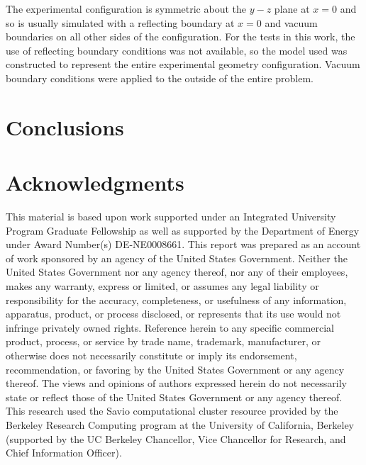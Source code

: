 \documentclass{article} %
\begin{document}
The experimental configuration is symmetric about the $y-z$ plane at $x = 0$
and so is usually simulated with a reflecting boundary at $x = 0$ and vacuum
boundaries on all other sides of the configuration. For the tests in this work,
the use of reflecting boundary conditions was not available, so the model used 
was constructed to represent the entire experimental geometry configuration.
Vacuum boundary conditions were applied to the outside of the entire problem.

\section{Conclusions}
\label{sec:conclusions}

\pagebreak
\section*{Acknowledgments}

This material is based upon work supported under an Integrated
University Program Graduate Fellowship as well as supported by the Department 
of Energy under Award Number(s) DE-NE0008661. This report was prepared as an
account of work sponsored by an agency of the United States Government.
Neither the United States Government nor any agency thereof, nor any of their
employees, makes any warranty, express or limited, or assumes any legal
liability or responsibility for the accuracy, completeness, or usefulness of
any information, apparatus, product, or process disclosed, or represents that
its use would not infringe privately owned rights. Reference herein to any 
specific commercial product, process, or service by trade name, trademark, 
manufacturer, or otherwise does not necessarily constitute or imply its 
endorsement, recommendation, or favoring by the United States Government or
any agency thereof. The views and opinions of authors expressed herein do not 
necessarily state or reflect those of the United States Government or any 
agency thereof. This research used the Savio computational cluster resource 
provided by the Berkeley Research Computing program at the University of 
California, Berkeley (supported by the UC Berkeley Chancellor, Vice Chancellor
for Research, and Chief Information Officer).

\pagebreak



\end{document}
